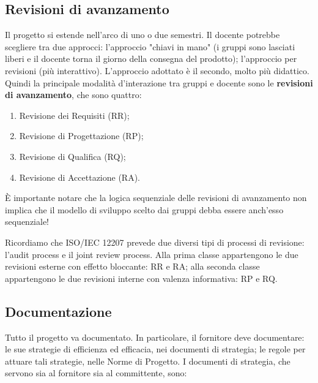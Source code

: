 \documentclass[a4paper]{article}
\begin{document}
		
	\subsection{Revisioni di avanzamento}

		
Il progetto si estende nell'arco di uno o due semestri. Il docente potrebbe scegliere tra due approcci: l'approccio "chiavi in mano" (i gruppi sono lasciati liberi e il docente torna il giorno della consegna del prodotto); l'approccio per revisioni (più interattivo). L'approccio adottato è il secondo, molto più didattico. Quindi la principale modalità d'interazione tra gruppi e docente sono le \textbf{revisioni di avanzamento}, che sono quattro:
		
	\begin{enumerate}
		
			
	\item Revisione dei Requisiti (RR);
			
	\item Revisione di Progettazione (RP);
			
	\item Revisione di Qualifica (RQ);
			
	\item Revisione di Accettazione (RA).
		
	\end{enumerate}

		
È importante notare che la logica sequenziale delle revisioni di avanzamento non implica che il modello di sviluppo scelto dai gruppi debba essere anch'esso sequenziale!
		
Ricordiamo che ISO/IEC 12207 prevede due diversi tipi di processi di revisione: l'audit process e il joint review process. Alla prima classe appartengono le due revisioni esterne con effetto bloccante: RR e RA; alla seconda classe appartengono le due revisioni interne con valenza informativa: RP e RQ.

		
	\subsection{Documentazione}

		
Tutto il progetto va documentato. In particolare, il fornitore deve documentare: le sue strategie di efficienza ed efficacia, nei documenti di strategia; le regole per attuare tali strategie, nelle Norme di Progetto. I documenti di strategia, che servono sia al fornitore sia al committente, sono:
		
\end{document}
